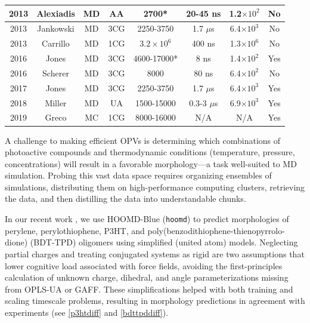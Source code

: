 \begin{landscape}
\begin{table}
\begin{tabular}{|c|c|c|c|c|c|c|c|}
\hline
    2013 & Alexiadis\cite{Alexiadis2013} & MD & AA & 2700* & 20-45 ns & 1.2$\times 10^{2}$ & No \\
\hline
    2013 & Jankowski\cite{Jankowski2013} & MD & 3CG & 2250-3750 & 1.7 $\mu$s & 6.4$\times 10^{3}$  & No \\
\hline
    2013 & Carrillo\cite{Carrillo2013} & MD & 1CG & $3.2 \times 10^{6}$ & 400 ns & 1.3$\times 10^{6}$ & No \\
\hline
    2016 & Jones\cite{Jones2016} & MD & 3CG & 4600-17000* & 8 ns & 1.4$\times 10^{2}$  & Yes \\
\hline
    2016 & Scherer\cite{Scherer2016} & MD & 3CG & 8000 & 80 ns & 6.4$\times 10^{2}$  & No \\
\hline
    2017 & Jones\cite{Jones2017} & MD & 3CG & 2250-3750 & 1.7 $\mu$s & 6.4$\times 10^{3}$  & Yes \\
\hline
    2018 & Miller\cite{Miller2018, Miller2018a} & MD & UA & 1500-15000 & 0.3-3 $\mu$s & 6.9$\times 10^{3}$  & Yes \\
\hline
    2019 & Greco\cite{Greco2019} & MC & 1CG & 8000-16000 & N/A & N/A  & Yes \\
\hline
\end{tabular}
\label{table:p3ht-simulations}
\end{table}
\end{landscape}

A challenge to making efficient OPVs is determining which combinations of photoactive compounds and thermodynamic conditions (temperature, pressure, concentrations) will result in a favorable morphology---a task well-suited to MD simulation.
Probing this vast data space requires organizing ensembles of simulations, distributing them on high-performance computing clusters, retrieving the data, and then distilling the data into understandable chunks.

In our recent work \cite{Miller2016,Henry2017a,Miller2018,Miller2018a}, we use HOOMD-Blue (\texttt{hoomd}) to predict morphologies of perylene, perylothiophene, P3HT, and poly(benzodithiophene-thienopyrrolo-dione) (BDT-TPD) oligomers using simplified (united atom) models.
Neglecting partial charges and treating conjugated systems as rigid are two assumptions that lower cognitive load associated with force fields, avoiding the first-principles calculation of unknown charge, dihedral, and angle parameterizations missing from OPLS-UA or GAFF.
These simplifications helped with both training and scaling timescale problems, resulting in morphology predictions in agreement with experiments \cite{Miller2016, Henry2017a,Miller2018} (see \autoref{p3htdiff} and \autoref{bdttpddiff}).

